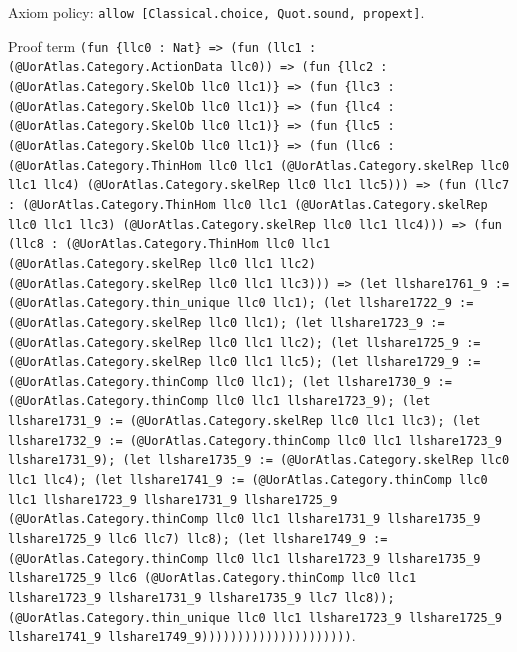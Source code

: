 \documentclass[11pt]{article}
\begin{document}
\noindent Axiom policy: \texttt{allow [Classical.choice, Quot.sound, propext]}.\par
\noindent Proof term \texttt{(fun \{llc0 : Nat\} => (fun (llc1 : (@UorAtlas.Category.ActionData llc0)) => (fun \{llc2 : (@UorAtlas.Category.SkelOb llc0 llc1)\} => (fun \{llc3 : (@UorAtlas.Category.SkelOb llc0 llc1)\} => (fun \{llc4 : (@UorAtlas.Category.SkelOb llc0 llc1)\} => (fun \{llc5 : (@UorAtlas.Category.SkelOb llc0 llc1)\} => (fun (llc6 : (@UorAtlas.Category.ThinHom llc0 llc1 (@UorAtlas.Category.skelRep llc0 llc1 llc4) (@UorAtlas.Category.skelRep llc0 llc1 llc5))) => (fun (llc7 : (@UorAtlas.Category.ThinHom llc0 llc1 (@UorAtlas.Category.skelRep llc0 llc1 llc3) (@UorAtlas.Category.skelRep llc0 llc1 llc4))) => (fun (llc8 : (@UorAtlas.Category.ThinHom llc0 llc1 (@UorAtlas.Category.skelRep llc0 llc1 llc2) (@UorAtlas.Category.skelRep llc0 llc1 llc3))) => (let llshare1761\_9 := (@UorAtlas.Category.thin\_unique llc0 llc1); (let llshare1722\_9 := (@UorAtlas.Category.skelRep llc0 llc1); (let llshare1723\_9 := (@UorAtlas.Category.skelRep llc0 llc1 llc2); (let llshare1725\_9 := (@UorAtlas.Category.skelRep llc0 llc1 llc5); (let llshare1729\_9 := (@UorAtlas.Category.thinComp llc0 llc1); (let llshare1730\_9 := (@UorAtlas.Category.thinComp llc0 llc1 llshare1723\_9); (let llshare1731\_9 := (@UorAtlas.Category.skelRep llc0 llc1 llc3); (let llshare1732\_9 := (@UorAtlas.Category.thinComp llc0 llc1 llshare1723\_9 llshare1731\_9); (let llshare1735\_9 := (@UorAtlas.Category.skelRep llc0 llc1 llc4); (let llshare1741\_9 := (@UorAtlas.Category.thinComp llc0 llc1 llshare1723\_9 llshare1731\_9 llshare1725\_9 (@UorAtlas.Category.thinComp llc0 llc1 llshare1731\_9 llshare1735\_9 llshare1725\_9 llc6 llc7) llc8); (let llshare1749\_9 := (@UorAtlas.Category.thinComp llc0 llc1 llshare1723\_9 llshare1735\_9 llshare1725\_9 llc6 (@UorAtlas.Category.thinComp llc0 llc1 llshare1723\_9 llshare1731\_9 llshare1735\_9 llc7 llc8)); (@UorAtlas.Category.thin\_unique llc0 llc1 llshare1723\_9 llshare1725\_9 llshare1741\_9 llshare1749\_9)))))))))))))))))))))}.\par
\end{document}
